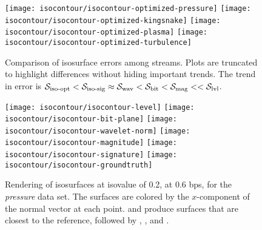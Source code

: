 \begin{figure*}[t]
\centering
{}
{\texttt{[image: isocontour/isocontour-optimized-pressure]}\vspace{-0.5em}}
{\texttt{[image: isocontour/isocontour-optimized-kingsnake]}\vspace{-0.5em}}
{\texttt{[image: isocontour/isocontour-optimized-plasma]}\vspace{-0.5em}}
{\texttt{[image: isocontour/isocontour-optimized-turbulence]}\vspace{-0.5em}}
\vspace{-0.5em}
\caption{Comparison of isosurface errors among streams. Plots are truncated to highlight differences
without hiding important trends. The trend in error is $\siop < \sisg \approx \swav < \sbit < \smag
<< \slvl$.}\label{fig:isocontour-plots}
\vspace{1em}

\centering
{}
{\texttt{[image: isocontour/isocontour-level]}\vspace{-0.5em}}
{\texttt{[image: isocontour/isocontour-bit-plane]}\vspace{-0.5em}}
{\texttt{[image: isocontour/isocontour-wavelet-norm]}\vspace{-0.5em}}
{\texttt{[image: isocontour/isocontour-magnitude]}\vspace{-0.5em}}
{\texttt{[image: isocontour/isocontour-signature]}\vspace{-0.5em}}
{\texttt{[image: isocontour/isocontour-groundtruth]}\vspace{-0.5em}}
\vspace{-0.5em}
\caption{Rendering of isosurfaces at isovalue of 0.2, at 0.6 bps, for the \emph{pressure} data set.
The surfaces are colored by the $x$-component of the normal vector at each point. \swav and
\sisg produce surfaces that are closest to the reference, followed by \sbit, \smag, and \slvl.}
\label{fig:isocontour-surfaces-pressure}
\vspace{-1.5em}
\end{figure*}


